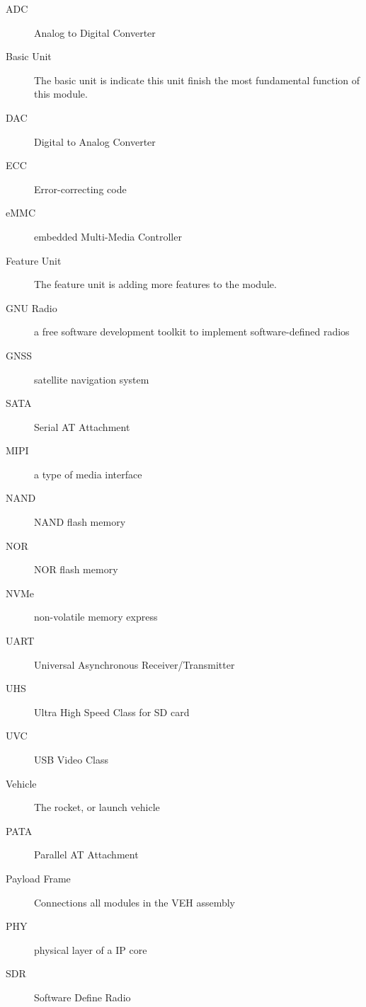 \documentclass[12pt,article]{memoir}
\begin{document}
\begin{description}
	\item[ADC] Analog to Digital Converter
	\item[Basic Unit] The basic unit is indicate this unit finish the most fundamental function of this module.
	\item[DAC] Digital to Analog Converter
	\item[ECC] Error-correcting code
	\item[eMMC] embedded Multi-Media Controller
	\item[Feature Unit] The feature unit is adding more features to the module.
	\item[GNU Radio] a free software development toolkit to implement software-defined radios
	\item[GNSS] satellite navigation system
	\item[SATA] Serial AT Attachment
	\item[MIPI] a type of media interface
	\item[NAND] NAND flash memory
	\item[NOR] NOR flash memory
	\item[NVMe] non-volatile memory express
	\item[UART] Universal Asynchronous Receiver/Transmitter
	\item[UHS] Ultra High Speed Class for SD card
	\item[UVC] USB Video Class
	\item[Vehicle] The rocket, or launch vehicle
	\item[PATA] Parallel AT Attachment
	\item[Payload Frame] Connections all modules in the VEH assembly
	\item[PHY] physical layer of a IP core
	\item[SDR] Software Define Radio
\end{description}

\end{document}
